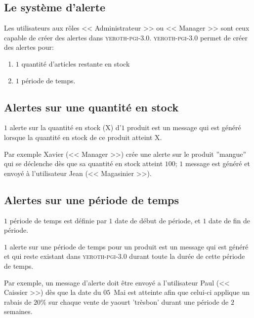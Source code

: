 \documentclass[a4paper, 10pt]{article}
\newcommand{\yeroth}{\textsc{yeroth-pgi-3.0}\xspace}
\newcommand{\manager}{<< Manager >>\xspace}
\newcommand{\caissier}{<< Caissier >>\xspace}
\newcommand{\administrateur}{<< Administrateur >>\xspace}
\newcommand{\magasinier}{<< Magasinier >>\xspace}
\begin{document}
\begin{multicols}{2}
\vspace{-1em}
\section{Le syst\`eme d'alerte}
\vspace{-0.5em}
Les utilisateurs aux r\^oles \administrateur ou
\manager sont ceux capable de cr\'eer des
alertes dans \yeroth.
\yeroth permet  de cr\'eer des alertes pour:
\begin{enumerate}[1.]
	\itemsep -0.5em
	\item $1$ quantit\'e d'articles restante en stock
	\item $1$ p\'eriode de temps.
\end{enumerate}

\vspace{-1em}

\subsection{Alertes sur une quantit\'e en stock}
\vspace{-0.1em}
$1$ alerte sur la quantit\'e en stock (X) d'$1$ produit
est un message qui est g\'en\'er\'e lorsque la
quantit\'e en stock de ce produit atteint X.

Par exemple Xavier (\manager) cr\'ee une alerte sur le
produit ''mangue'' qui se d\'eclenche d\`es que sa quantit\'e
en stock atteint $100$; $1$ message est g\'en\'er\'e et
envoy\'e \`a l'utilisateur Jean (\magasinier).

\vspace{-1em}

\subsection{Alertes sur une p\'eriode de temps}
\vspace{-0.1em}
$1$ p\'eriode de temps est d\'efinie par $1$ date
de d\'ebut de p\'eriode, et $1$ date de fin
de p\'eriode.

$1$ alerte sur une p\'eriode de temps pour un
produit est un message qui est g\'en\'er\'e et 
qui reste existant dans \yeroth durant toute la
dur\'ee de cette p\'eriode de temps.

Par exemple, un message d'alerte doit \^etre envoy\'e
a l'utilisateur Paul (\caissier) d\`es que
la date du $05$~Mai est atteinte afin que celui-ci
applique un rabais de $20\%$ sur chaque vente de
yaourt 'tr\`esbon' durant une p\'eriode de $2$ semaines.


\end{multicols}
\end{document}

